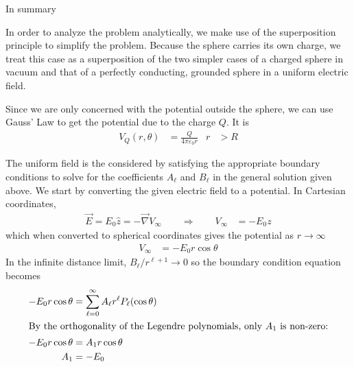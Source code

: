 In summary
\par{}
\vspace{\baselineskip}

In order to analyze the problem analytically, we make use of the
superposition principle to simplify the problem. Because the sphere carries
its own charge, we treat this case as a superposition of the two simpler
cases of a charged sphere in vacuum and that of a perfectly conducting,
grounded sphere in a uniform electric field.

Since we are only concerned with the potential outside the sphere, we can use
Gauss' Law to get the potential due to the charge $Q$. It is
\begin{align*}
    V_Q(r,\theta ) &= \frac{Q}{4{\pi}\varepsilon _0r} & r &> R
\end{align*}

The uniform field is the considered by satisfying the appropriate boundary
conditions to solve for the coefficients $A_\ell $ and $B_\ell $ in the general
solution given above. We start by converting the given electric field to a
potential. In Cartesian coordinates,
\begin{align*}
    \vec E = E_0\hat z = -\vec \nabla V_\infty  \quad\quad\Rightarrow\quad\quad V_\infty  &= -E_0z
\end{align*}
which when converted to spherical coordinates gives the potential as $r\rightarrow \infty $
\begin{align*}
    V_\infty  &= -E_0r\cos \theta 
\end{align*}
In the infinite distance limit, $B_\ell /r^{\ell +1} \rightarrow  0$ so the boundary condition
equation becomes
\begin{align*}
    -E_0r\cos \theta  &= \sum_{\ell =0}^\infty  A_\ell  r^\ell  P_\ell (\cos \theta ) \\
\intertext{By the orthogonality of the Legendre polynomials, only $A_1$ is
non-zero:}
    -E_0r\cos \theta  &= A_1r\cos \theta  \\
    A_1 &= -E_0
\end{align*}

